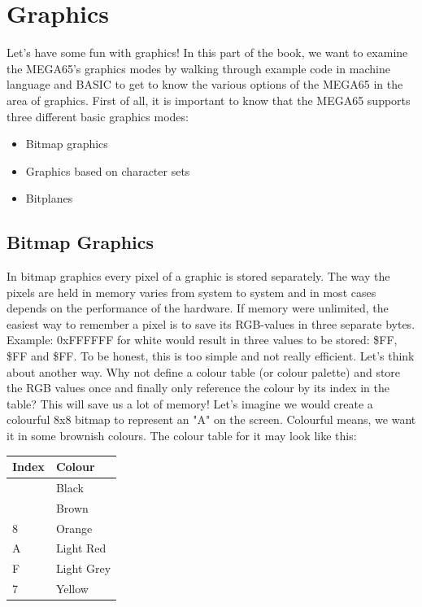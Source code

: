 
\newcommand{\blkb}{\cellcolor[rgb]{0,0,0}\textcolor{white} 0 }
\newcommand{\bwn}{\cellcolor[rgb]{.26,.22,0}\textcolor{white} 9 }
\newcommand{\ora}{\cellcolor[rgb]{.44,.31,.15}8 }
\newcommand{\red}{\cellcolor[rgb]{.6,.4,.35}A }
\newcommand{\lgr}{\cellcolor[rgb]{.58,.58,.58}F }
\newcommand{\yel}{\cellcolor[rgb]{1.,.95,0.}7 }

\newcommand{\redb}{\cellcolor[rgb]{.6,.4,.35} 1 }

\chapter{Graphics}
\label{cha:graphics}

Let's have some fun with graphics!
In this part of the book, we want to examine the MEGA65's graphics modes by walking through example code in machine language and BASIC to get to know the various options of the MEGA65 in the area of graphics. First of all, it is important to know that the MEGA65 supports three different basic graphics modes:

\begin{itemize}
	\item Bitmap graphics
	\item Graphics based on character sets
	\item Bitplanes
\end{itemize}


\section*{Bitmap Graphics}

In bitmap graphics every pixel of a graphic is stored separately. The way the pixels are held in memory varies from system to system and in most cases depends on the performance of the hardware. If memory were unlimited, the easiest way to remember a pixel is to save its RGB-values in three separate bytes. Example: 0xFFFFFF for white would result in three values to be stored: \$FF, \$FF and \$FF. To be honest, this is too simple and not really efficient. Let’s think about another way. Why not define a colour table (or colour palette) and store the RGB values once and finally only reference the colour by its index in the table? This will save us a lot of memory! Let's imagine we would create a colourful 8x8 bitmap to represent an "A" on the screen. Colourful means, we want it in some brownish colours. The colour table for it may look like this:

\begin{center}
\begin{tabular}{|l|l|}
\hline
	Index & Colour \\
\hline
	\blkb & Black \\
	\bwn & Brown \\
	\ora & Orange \\
	\red & Light Red \\
	\lgr & Light Grey \\
	\yel & Yellow \\
\hline
\end{tabular}
\end{center}

